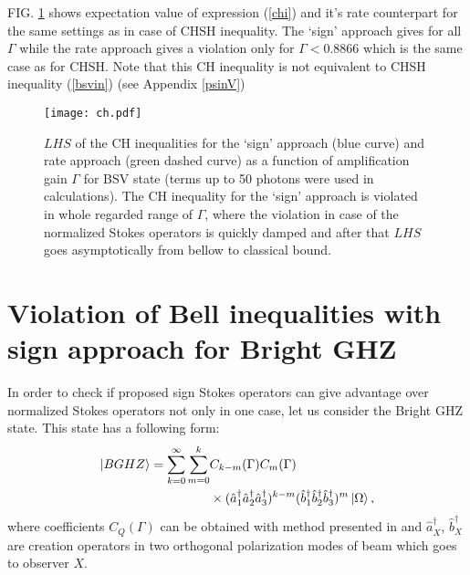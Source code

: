 \documentclass[aps,pra, twocolumn, showpacs]{revtex4-2}
\begin{document}

FIG. \ref{chfig} shows expectation value of expression  (\ref{chi}) and it's rate counterpart for the same settings as in case of CHSH inequality. The `sign' approach gives  for all $\Gamma$ while the  rate approach gives a violation only for $\Gamma<0.8866$ which is the same case as for CHSH. Note that this CH inequality is not equivalent to CHSH inequality (\ref{bsvin}) (see Appendix \ref{psinV})


\begin{figure}[h!]
\centering
\texttt{[image: ch.pdf]} 
\caption{$LHS$ of the CH inequalities for the `sign' approach (blue curve) and rate approach \cite{ZUKUBELL} (green dashed curve) as a function of amplification gain  $\Gamma$ for BSV state (terms up to 50 photons were used in calculations). The CH inequality for the `sign' approach is violated in whole regarded range of $\Gamma$, where the violation in case of the normalized Stokes operators is quickly damped and after that $LHS$ goes asymptotically from bellow to classical bound.  }
\label{chfig}
\end{figure}

\section{Violation of Bell inequalities with sign approach for Bright GHZ}
In order to check if proposed sign Stokes operators can give advantage over normalized Stokes operators not only in one case, let us consider the Bright GHZ state. This state has a following form: 
\begin{align}
\begin{split}
\ket{BGHZ}=\sum_{k=0}^\infty\sum_{m=0}^k& C_{k-m}(\Gamma)C_m(\Gamma)\\
&\times(\hat a_1^\dagger\hat a_2^\dagger\hat a_3^\dagger )^{k-m}(\hat b_1^\dagger \hat b_2^\dagger \hat b_3^\dagger)^m\ket{\Omega}, 
\label{BGHZ0} 
\end{split}
\end{align}
where coefficients $C_Q(\Gamma)$ can be obtained with method presented in \cite{BGHZ} and $\hat a_X^\dagger$, $\hat b_X^\dagger$ are creation operators in two orthogonal polarization modes of beam which goes to observer $X$.
\end{document}
